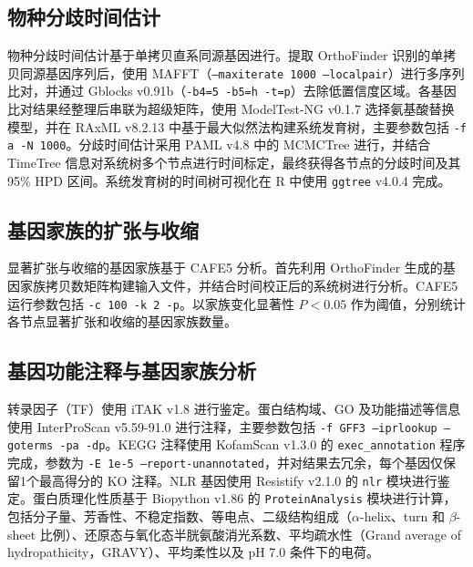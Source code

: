 \subsection{物种分歧时间估计}

物种分歧时间估计基于单拷贝直系同源基因进行。提取 OrthoFinder 识别的单拷贝同源基因序列后\cite{emms2019orthofinder}，使用 MAFFT（\texttt{--maxiterate 1000 --localpair}）进行多序列比对\cite{katoh2002mafft}，并通过 Gblocks v0.91b（\texttt{-b4=5 -b5=h -t=p}）去除低置信度区域\cite{castresana2000selection}。各基因比对结果经整理后串联为超级矩阵，使用 ModelTest-NG v0.1.7 选择氨基酸替换模型\cite{darriba2020modeltest}，并在 RAxML v8.2.13 中基于最大似然法构建系统发育树\cite{stamatakis2014raxml}，主要参数包括 \texttt{-f a -N 1000}。分歧时间估计采用 PAML v4.8 中的 MCMCTree 进行\cite{yang2007paml}，并结合 TimeTree 信息对系统树多个节点进行时间标定\cite{kumar2022timetree}，最终获得各节点的分歧时间及其 95\% HPD 区间。系统发育树的时间树可视化在 R 中使用 \texttt{ggtree} v4.0.4 完成\cite{yu2017ggtree}。

\subsection{基因家族的扩张与收缩}

显著扩张与收缩的基因家族基于 CAFE5 分析\cite{mendes2020cafe}。首先利用 OrthoFinder 生成的基因家族拷贝数矩阵构建输入文件\cite{emms2019orthofinder}，并结合时间校正后的系统树进行分析。CAFE5 运行参数包括 \texttt{-c 100 -k 2 -p}。以家族变化显著性 \(P<0.05\) 作为阈值，分别统计各节点显著扩张和收缩的基因家族数量。

\subsection{基因功能注释与基因家族分析}
转录因子（TF）使用 iTAK v1.8 进行鉴定\cite{zheng2016itak}。蛋白结构域、GO 及功能描述等信息使用 InterProScan v5.59-91.0 进行注释\cite{jones2014interproscan}，主要参数包括 \texttt{-f GFF3 --iprlookup --goterms -pa -dp}。KEGG 注释使用 KofamScan v1.3.0 的 \texttt{exec\_annotation} 程序完成\cite{aramaki2020kofamkoala}，参数为 \texttt{-E 1e-5 --report-unannotated}，并对结果去冗余，每个基因仅保留1个最高得分的 KO 注释。NLR 基因使用 Resistify v2.1.0 的 \texttt{nlr} 模块进行鉴定\cite{smith2025resistify}。蛋白质理化性质基于 Biopython v1.86 的 \texttt{ProteinAnalysis} 模块进行计算\cite{cock2009biopython}，包括分子量、芳香性、不稳定指数、等电点、二级结构组成（$\alpha$-helix、turn 和 $\beta$-sheet 比例）、还原态与氧化态半胱氨酸消光系数、平均疏水性（Grand average of hydropathicity，GRAVY）、平均柔性以及 pH 7.0 条件下的电荷。

